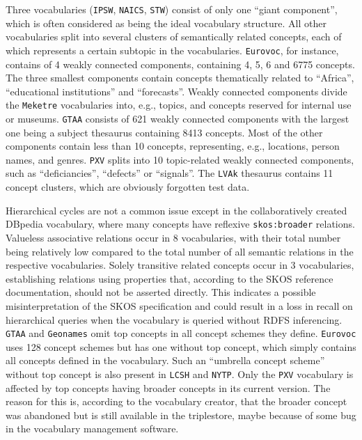 Three vocabularies (\texttt{IPSW}, \texttt{NAICS}, \texttt{STW}) consist of only one ``giant component'', which is often considered as being the ideal vocabulary structure. All other vocabularies split into several clusters of semantically related concepts, each of which represents a certain subtopic in the vocabularies. \texttt{Eurovoc}, for instance, contains of 4 weakly connected components, containing 4, 5, 6 and 6775 concepts. The three smallest components contain concepts thematically related to ``Africa'', ``educational institutions'' and ``forecasts''. Weakly connected components divide the \texttt{Meketre} vocabularies into, e.g., topics, and concepts reserved for internal use or museums. \texttt{GTAA} consists of 621 weakly connected components with the largest one being a subject thesaurus containing 8413 concepts. Most of the other components contain less than 10 concepts, representing, e.g., locations, person names, and genres. \texttt{PXV} splits into 10 topic-related weakly connected components, such as ``deficiancies'', ``defects'' or ``signals''. The \texttt{LVAk} thesaurus contains 11 concept clusters, which are obviously forgotten test data.

Hierarchical cycles are not a common issue except in the collaboratively created DBpedia vocabulary, where many concepts have reflexive \texttt{skos:broader} relations.
Valueless associative relations occur in 8 vocabularies, with their total number being relatively low compared to the total number of all semantic relations in the respective vocabularies.
Solely transitive related concepts occur in 3 vocabularies, establishing relations using properties that, according to the SKOS reference documentation, should not be asserted directly. This indicates a possible misinterpretation of the SKOS specification and could result in a loss in recall on hierarchical queries when the vocabulary is queried without RDFS inferencing.
\texttt{GTAA} and \texttt{Geonames} omit top concepts in all concept schemes they define. \texttt{Eurovoc} uses 128 concept schemes but has one without top concept, which simply contains all concepts defined in the vocabulary. Such an ``umbrella concept scheme'' without top concept is also present in \texttt{LCSH} and \texttt{NYTP}.
Only the \texttt{PXV} vocabulary is affected by top concepts having broader concepts in its current version. The reason for this is, according to the vocabulary creator, that the broader concept was abandoned but is still available in the triplestore, maybe because of some bug in the vocabulary management software.

